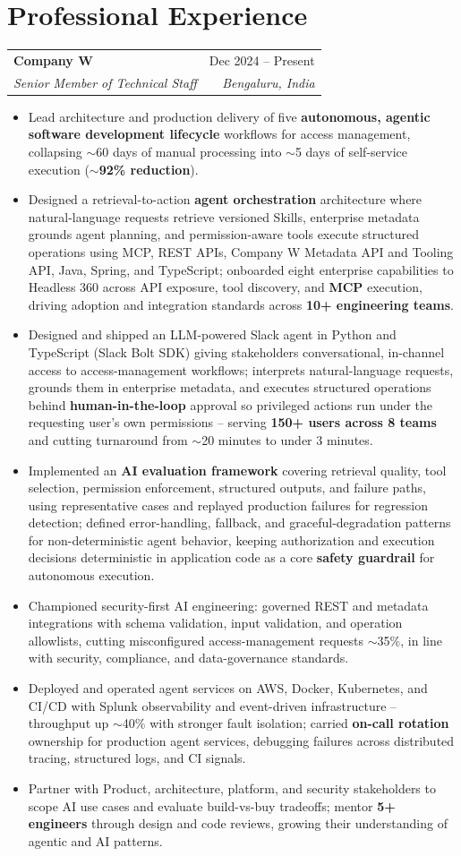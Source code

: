 \documentclass[10.5pt,letterpaper]{article}
\makeatletter
\newcommand{\resumeItem}[1]{\item\small{#1}}
\newcommand{\resumeSubheading}[4]{
  \vspace{4pt}\noindent
  \begin{tabular*}{\textwidth}{l@{\extracolsep{\fill}}r}
    \textbf{#1} & #2 \\
    \textit{\small #3} & \textit{\small #4} \\
  \end{tabular*}\vspace{-2pt}
}
\makeatother
\begin{document}
\section*{Professional Experience}

\resumeSubheading{Company W}{Dec 2024 -- Present}{Senior Member of Technical Staff}{Bengaluru, India}
\begin{itemize}
    \resumeItem{Lead architecture and production delivery of five \textbf{autonomous, agentic software development lifecycle} workflows for access management, collapsing $\sim$60 days of manual processing into $\sim$5 days of self-service execution ($\sim$\textbf{92\% reduction}).}
    \resumeItem{Designed a retrieval-to-action \textbf{agent orchestration} architecture where natural-language requests retrieve versioned Skills, enterprise metadata grounds agent planning, and permission-aware tools execute structured operations using MCP, REST APIs, Company W Metadata API and Tooling API, Java, Spring, and TypeScript; onboarded eight enterprise capabilities to Headless 360 across API exposure, tool discovery, and \textbf{MCP} execution, driving adoption and integration standards across \textbf{10+ engineering teams}.}
    \resumeItem{Designed and shipped an LLM-powered Slack agent in Python and TypeScript (Slack Bolt SDK) giving stakeholders conversational, in-channel access to access-management workflows; interprets natural-language requests, grounds them in enterprise metadata, and executes structured operations behind \textbf{human-in-the-loop} approval so privileged actions run under the requesting user's own permissions -- serving \textbf{150+ users across 8 teams} and cutting turnaround from $\sim$20 minutes to under 3 minutes.}
    \resumeItem{Implemented an \textbf{AI evaluation framework} covering retrieval quality, tool selection, permission enforcement, structured outputs, and failure paths, using representative cases and replayed production failures for regression detection; defined error-handling, fallback, and graceful-degradation patterns for non-deterministic agent behavior, keeping authorization and execution decisions deterministic in application code as a core \textbf{safety guardrail} for autonomous execution.}
    \resumeItem{Championed security-first AI engineering: governed REST and metadata integrations with schema validation, input validation, and operation allowlists, cutting misconfigured access-management requests $\sim$35\%, in line with security, compliance, and data-governance standards.}
    \resumeItem{Deployed and operated agent services on AWS, Docker, Kubernetes, and CI/CD with Splunk observability and event-driven infrastructure -- throughput up $\sim$40\% with stronger fault isolation; carried \textbf{on-call rotation} ownership for production agent services, debugging failures across distributed tracing, structured logs, and CI signals.}
    \resumeItem{Partner with Product, architecture, platform, and security stakeholders to scope AI use cases and evaluate build-vs-buy tradeoffs; mentor \textbf{5+ engineers} through design and code reviews, growing their understanding of agentic and AI patterns.}
\end{itemize}
\end{document}
